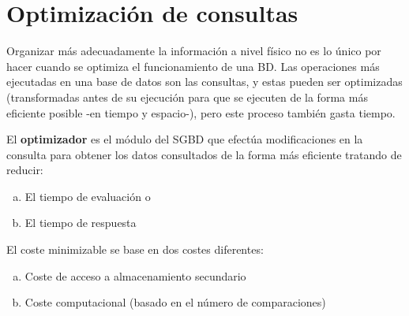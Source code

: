 \chapter{Optimización de consultas}

Organizar más adecuadamente la información a nivel físico no es lo único por hacer cuando se optimiza el funcionamiento de una BD. Las operaciones más ejecutadas en una base de datos son las consultas, y estas pueden ser optimizadas (transformadas antes de su ejecución para que se ejecuten de la forma más eficiente posible -en tiempo y espacio-), pero este proceso también gasta tiempo.

El \textbf{optimizador} es el módulo del SGBD que efectúa modificaciones en la consulta para obtener los datos consultados de la forma más eficiente tratando de reducir:
\begin{enumerate}[(a)]
\item El tiempo de evaluación o
\item El tiempo de respuesta
\end{enumerate}
El coste minimizable se base en dos costes diferentes:
\begin{enumerate}[(a)]
\item Coste de acceso a almacenamiento secundario
\item Coste computacional (basado en el número de comparaciones)
\end{enumerate}
\medskip
